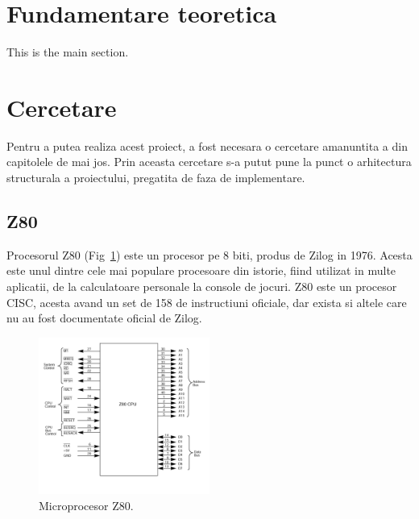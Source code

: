 \documentclass[titlepage,12pt]{article}
\begin{document}
\section{Fundamentare teoretica}
This is the main section.

\section{Cercetare}
Pentru a putea realiza acest proiect, a fost necesara o cercetare amanuntita a din capitolele de mai jos.
Prin aceasta cercetare s-a putut pune la punct o arhitectura structurala a proiectului, pregatita de faza de implementare.

\subsection{\ac {Z80}}
Procesorul Z80 (Fig~\ref{fig:z80}) este un procesor pe 8 biti, produs de Zilog in 1976. Acesta este unul dintre cele mai populare procesoare din istorie, fiind utilizat in multe aplicatii, de la calculatoare personale la console de jocuri.
\ac {Z80} este un procesor CISC, acesta avand un set de 158 de instructiuni oficiale, dar exista si altele care nu au fost documentate oficial de Zilog.

\begin{figure}[H]
    \centering
    \includegraphics[width=0.5\textwidth]{images/z80.jpg}
    \caption{Microprocesor Z80.}
    \label{fig:z80}
\end{figure}
\end{document}
